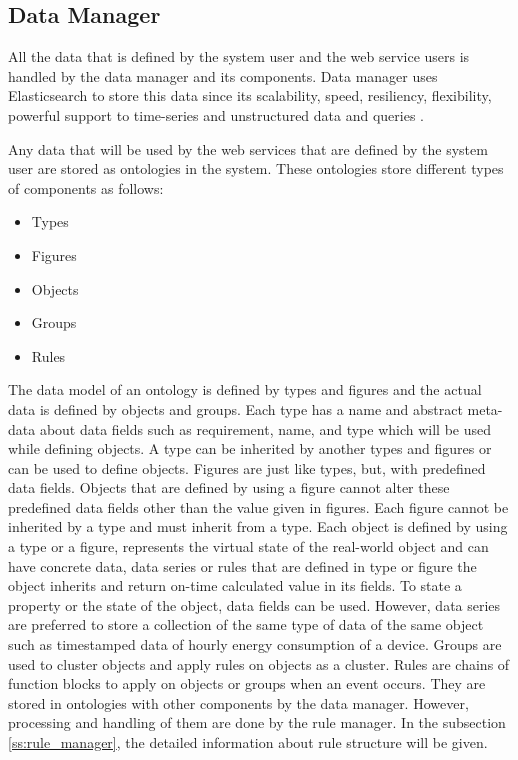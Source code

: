 \subsection{Data Manager}

All the data that is defined by the system user and the web service users is handled by the data manager and its components. Data manager uses Elasticsearch to store this data since its scalability, speed, resiliency, flexibility, powerful support to time-series and unstructured data and queries \cite{elastic, elastic_time}.

Any data that will be used by the web services that are defined by the system user are stored as ontologies in the system. These ontologies store different types of components as follows:

\begin{itemize}
  \item Types
  \item Figures
  \item Objects
  \item Groups
  \item Rules
\end{itemize}

The data model of an ontology is defined by types and figures and the actual data is defined by objects and groups. Each type has a name and abstract meta-data about data fields such as requirement, name, and type which will be used while defining objects. A type can be inherited by another types and figures or can be used to define objects. Figures are just like types, but, with predefined data fields. Objects that are defined by using a figure cannot alter these predefined data fields other than the value given in figures. Each figure cannot be inherited by a type and must inherit from a type. Each object is defined by using a type or a figure, represents the virtual state of the real-world object and can have concrete data, data series or rules that are defined in type or figure the object inherits and return on-time calculated value in its fields. To state a property or the state of the object, data fields can be used. However, data series are preferred to store a collection of the same type of data of the same object such as timestamped data of hourly energy consumption of a device. Groups are used to cluster objects and apply rules on objects as a cluster. Rules are chains of function blocks to apply on objects or groups when an event occurs. They are stored in ontologies with other components by the data manager. However, processing and handling of them are done by the rule manager. In the subsection \ref{ss:rule_manager}, the detailed information about rule structure will be given.

